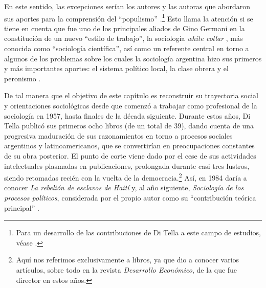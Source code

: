 En este sentido, las excepciones serían los autores y las autoras que abordaron sus aportes para la comprensión del \enquote{populismo} \parencite{1531-QUATTROCCHIWOISSON1997,1555-CANOVAN1981,1685-HENNESSY1970,1693-LACLAU1977}.\footnote{Para un desarrollo de las contribuciones de Di Tella a este campo de estudios, véase \textcite[234-242]{278-AMARAL2018}.} Esto llama la atención si se tiene en cuenta que fue uno de los principales aliados de Gino Germani en la constitución de un nuevo \enquote{estilo de trabajo}, la sociología \emph{white collar} \parencite{1613-DELICH1977}, más conocida como \enquote{sociología científica}, así como un referente central en torno a algunos de los problemas sobre los cuales la sociología argentina hizo sus primeros y más importantes aportes: el sistema político local, la clase obrera y el peronismo \parencite{1511-SARLO2001,1548-NEIBURG1998,1565-BLANCO2006,1668-PEREYRA2005}.

De tal manera que el objetivo de este capítulo es reconstruir su trayectoria social y orientaciones sociológicas desde que comenzó a trabajar como profesional de la sociología en 1957, hasta finales de la década siguiente. Durante estos años, Di Tella publicó sus primeros ocho libros (de un total de 39), dando cuenta de una progresiva maduración de sus razonamientos en torno a procesos sociales argentinos y latinoamericanos, que se convertirían en preocupaciones constantes de su obra posterior. El punto de corte viene dado por el cese de sus actividades intelectuales plasmadas en publicaciones, prolongada durante casi tres lustros, siendo retomadas recién con la vuelta de la democracia.\footnote{Aquí nos referimos exclusivamente a libros, ya que dio a conocer varios artículos, sobre todo en la revista \emph{Desarrollo Económico}, de la que fue director en estos años.} Así, en 1984 daría a conocer \emph{La rebelión de esclavos de Haití} y, al año siguiente, \emph{Sociología de los procesos políticos}, considerada por el propio autor como su \enquote{contribución teórica principal} \parencite[289]{1553-CAMOU2009}.

